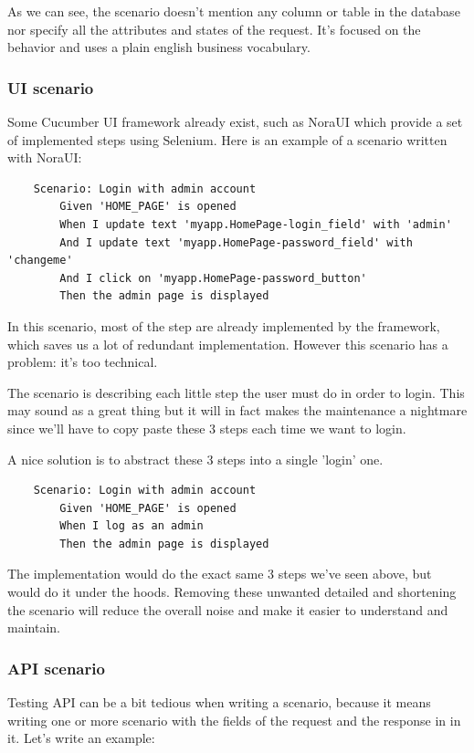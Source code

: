 As we can see, the scenario doesn't mention any column or table in the
database nor specify all the attributes and states of the request.
It's focused on the behavior and uses a plain english business vocabulary.

\subsubsection{UI scenario}
Some Cucumber UI framework already exist, such as NoraUI which provide a set
of implemented steps using Selenium.
Here is an example of a scenario written with NoraUI:

\begin{verbatim}
    Scenario: Login with admin account
        Given 'HOME_PAGE' is opened
        When I update text 'myapp.HomePage-login_field' with 'admin'
        And I update text 'myapp.HomePage-password_field' with 'changeme'
        And I click on 'myapp.HomePage-password_button'
        Then the admin page is displayed
\end{verbatim}

In this scenario, most of the step are already implemented by the framework,
which saves us a lot of redundant implementation.
However this scenario has a problem: it's too technical.

The scenario is describing each little step the user must do in order to login.
This may sound as a great thing but it will in fact makes the maintenance a
nightmare since we'll have to copy paste these 3 steps each time we want to
login.

A nice solution is to abstract these 3 steps into a single 'login' one.

\begin{verbatim}
    Scenario: Login with admin account
        Given 'HOME_PAGE' is opened
        When I log as an admin
        Then the admin page is displayed
\end{verbatim}

The implementation would do the exact same 3 steps we've seen above, but
would do it under the hoods.
Removing these unwanted detailed and shortening the scenario will reduce the
overall noise and make it easier to understand and maintain.

\subsubsection{API scenario}
Testing API can be a bit tedious when writing a scenario, because it means
writing one or more scenario with the fields of the request and the response in
in it.
Let's write an example:

